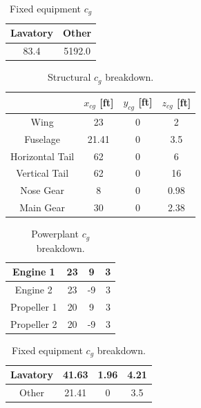 \documentclass[conf]{new-aiaa}
\begin{document}
\begin{table}
\label{tab:Fixed Equipment Weight}
\caption{Fixed equipment $c_g$}
\begin{tabular}{|c|c|}\hline
Lavatory & Other \\ \hline
83.4 & 5192.0 \\ \hline
\end{tabular}
\end{table}
\begin{table}
\label{tab:Structural cg}
\caption{Structural $c_g$ breakdown.}
\begin{tabular}{|c|c|c|c|}
	& $x_{cg}$ [ft] & $y_{cg}$ [ft] & $z_{cg}$ [ft] \\ \hline
Wing & 23 & 0 & 2\\ \hline
Fuselage & 21.41 & 0 & 3.5\\ \hline
Horizontal Tail & 62 & 0 & 6\\ \hline
Vertical Tail & 62	& 0 & 16\\ \hline
Nose Gear & 8 & 0 & 0.98\\ \hline
Main Gear & 30 & 0 & 2.38\\ \hline 
\end{tabular}
\end{table}

\begin{table}
\label{tab:Powerplant cg}
\caption{Powerplant $c_g$ breakdown.}
\begin{tabular}{|c|c|c|c|}\hline
Engine 1 & 23 & 9 & 3\\ \hline
Engine 2 & 23 & -9 & 3\\ \hline
Propeller 1 & 20 & 9 & 3 \\ \hline
Propeller 2 & 20 & -9 & 3\\ \hline
\end{tabular}
\end{table}

\begin{table}
\label{tab:Fixed equipment cg}
\caption{Fixed equipment $c_g$ breakdown.}
\begin{tabular}{|c|c|c|c|}\hline
Lavatory & 41.63 & 1.96 & 4.21\\ \hline
Other & 21.41 & 0 & 3.5\\ \hline

\end{tabular}
\end{table}

\end{document}
